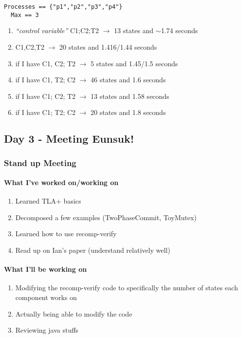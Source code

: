 \documentclass[11pt]{article}
\begin{document}
\begin{lstlisting}[]
  Processes == {"p1","p2","p3","p4"}
  Max == 3
  \end{lstlisting}

\begin{enumerate}
  \item \emph{``control variable''} C1;C2;T2 $\rightarrow$ 13 states and $\sim$1.74 seconds
  \item C1,C2,T2 $\rightarrow$ 20 states and 1.416/1.44 seconds
  \item if I have C1, C2; T2 $\rightarrow$ 5 states and 1.45/1.5 seconds
  \item if I have C1, T2; C2 $\rightarrow$ 46 states and 1.6 seconds
  \item if I have C1; C2; T2 $\rightarrow$ 13 states and 1.58 seconds
  \item if I have C1; T2; C2 $\rightarrow$ 20 states and 1.8 seconds

\end{enumerate}

\subsection{Day 3 - Meeting Eunsuk!}
\subsubsection*{Stand up Meeting}
\paragraph[short]{What I've worked on/working on}{
  \begin{enumerate}
    \item Learned TLA+ basics
    \item Decomposed a few examples (TwoPhaseCommit, ToyMutex)
    \item Learned how to use recomp-verify
    \item Read up on Ian's paper (understand relatively well)
  \end{enumerate}
}
\paragraph[short]{What I'll be working on}{
  \begin{enumerate}
    \item Modifying the recomp-verify code to specifically
    the number of states each component works on
    \item Actually being able to modify the code
    \item Reviewing java stuffs
  \end{enumerate}
}
\end{document}
